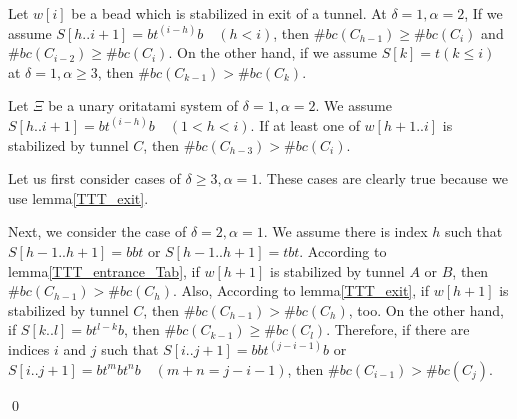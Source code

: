 \documentclass[runningheads]{llncs}
\begin{document}
\begin{lemma}
\label{TTT_exit}
Let $w[i]$ be a bead which is stabilized in exit of a tunnel.
At $\delta = 1, \alpha =2$, If we assume $S[h..i+1] = bt^{(i-h)}b \quad (h<i)$, then $\#bc(C_{h-1}) \geq \#bc(C_i)$ and $\#bc(C_{i-2}) \geq \#bc(C_i)$.
On the other hand, if we assume $S[k] = t (k \leq i)$ at $\delta =1, \alpha \geq 3$, then $\#bc(C_{k-1}) > \#bc(C_{k})$.
\end{lemma}

\begin{lemma}
\label{TTT_tunnelC_lemma}
Let $\Xi$ be a unary oritatami system of $\delta = 1, \alpha = 2$. We assume $S[h..i+1] = bt^{(i-h)}b \quad (1<h<i)$. If at least one of $w[h+1..i]$ is stabilized by tunnel $C$, then $\#bc(C_{h-3}) > \#bc(C_i)$.
\end{lemma}


Let us first consider cases of $\delta \geq 3, \alpha = 1$. These cases are clearly true because we use lemma\ref{TTT_exit}.


Next, we consider the case of $\delta = 2, \alpha = 1$. We assume there is index $h$ such that $S[h-1..h+1] = bbt$ or $S[h-1..h+1] = tbt$. According to lemma\ref{TTT_entrance_Tab}, if $w[h+1]$ is stabilized by tunnel $A$ or $B$, then $\#bc(C_{h-1}) > \#bc(C_{h})$. Also,  According to lemma\ref{TTT_exit}, if $w[h+1]$ is stabilized by tunnel $C$, then $\#bc(C_{h-1}) > \#bc(C_{h})$, too.
On the other hand, if $S[k..l] = bt^{l-k}b$, then $\#bc(C_{k-1}) \geq \#bc(C_{l})$. Therefore, if there are indices $i$ and $j$ such that $S[i..j+1] = bbt^{(j-i-1)}b$ or $S[i..j+1] = bt^mbt^nb \quad (m + n = j-i-1)$, then $\#bc(C_{i-1}) > \#bc(C_{j})$.

\qed
\end{document}
